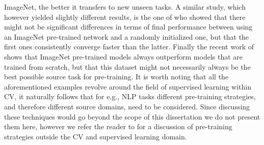 ImageNet, the better it transfers to new unseen tasks. A similar study, which however yielded slightly different results, is the one of \citet{he2019rethinking} who showed that there might not be significant differences in terms of final performance between using an ImageNet pre-trained network and a randomly initialized one, but that the first ones consistently converge faster than the latter. Finally the recent work of \citet{mensink2021factors} shows that ImageNet pre-trained models always outperform models that are trained from scratch, but that this dataset might not necessarily always be the best possible source task for pre-training. It is worth noting that all the aforementioned examples revolve around the field of supervised learning within CV, it naturally follows that for e.g., NLP tasks different pre-training strategies, and therefore different source domains, need to be considered. Since discussing these techniques would go beyond the scope of this dissertation we do not present them here, however we refer the reader to \cite{mikolov2013efficient,rosset2020knowledge,brown2020language,devlin2018bert} for a discussion of pre-training strategies outside the CV and supervised learning domain.

